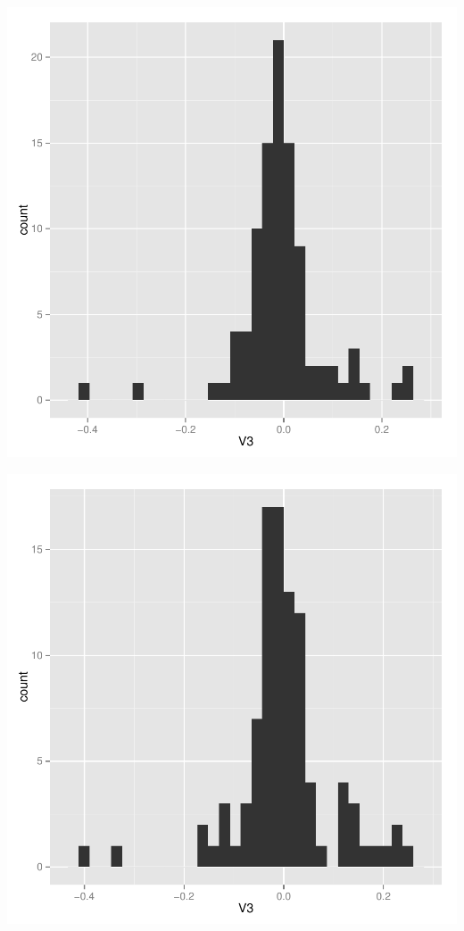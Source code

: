 \documentclass{article}
\begin{document}
\begin{center}

\includegraphics{Masterpiece-003}

\includegraphics{Masterpiece-004}


\end{center}
\end{document}
